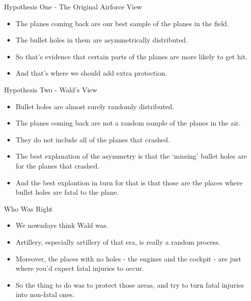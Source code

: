 \documentclass[
  ignorenonframetext,
]{beamer}
\providecommand{\tightlist}{%
  \setlength{\itemsep}{0pt}\setlength{\parskip}{0pt}}
\renewcommand{\,}{\text{, }}
\begin{document}
\begin{frame}{Hypothesis One - The Original Airforce View}
\protect\hypertarget{hypothesis-one---the-original-airforce-view}{}

\begin{itemize}
\tightlist
\item
  The planes coming back are our best sample of the planes in the field.
\item
  The bullet holes in them are asymmetrically distributed.
\item
  So that's evidence that certain parts of the planes are more likely to
  get hit.
\item
  And that's where we should add extra protection.
\end{itemize}

\end{frame}

\begin{frame}{Hypothesis Two - Wald's View}
\protect\hypertarget{hypothesis-two---walds-view}{}

\begin{itemize}
\tightlist
\item
  Bullet holes are almost surely randomly distributed.
\item
  The planes coming back are not a random sample of the planes in the
  air.
\item
  They do not include all of the planes that crashed.
\item
  The best explanation of the asymmetry is that the `missing' bullet
  holes are for the planes that crashed.
\item
  And the best explantion in turn for that is that those are the places
  where bullet holes are fatal to the plane.
\end{itemize}

\end{frame}

\begin{frame}{Who Was Right}
\protect\hypertarget{who-was-right}{}

\begin{itemize}
\tightlist
\item
  We nowadays think Wald was.
\item
  Artillery, especially artillery of that era, is really a random
  process.
\item
  Moreover, the places with no holes - the engines and the cockpit - are
  just where you'd expect fatal injuries to occur.
\item
  So the thing to do was to protect those areas, and try to turn fatal
  injuries into non-fatal ones.
\end{itemize}

\end{frame}
\end{document}
